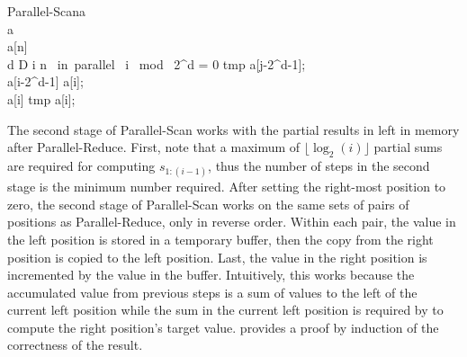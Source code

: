 {\begin{pseudocode}[ruled]{Parallel-Scan}{a}
\label{scan}
\\
a \GETS {}\\
a[n] \\
\FOR d \GETS D  \DO \BEGIN
  \FOR i  \TO n \mbox{ in parallel }\DO \BEGIN
    \IF i \mbox{ mod } 2^{d} = 0 \DO \BEGIN
    tmp \GETS a[j-2^{d-1}];\\
    a[i-2^{d-1}] \GETS a[i];\\
    a[i] \GETS tmp \oplus a[i];
    \END \END \END
{}
\end{pseudocode}



The second stage of Parallel-Scan works with the partial results in left in memory after Parallel-Reduce. First, note that a maximum of $\lfloor \log_2(i) \rfloor$ partial sums are required for computing $s_{1:(i-1)}$, thus the number of steps in the second stage is the minimum number required. After setting the right-most position to zero, the second stage of Parallel-Scan works on the same sets of pairs of positions as Parallel-Reduce, only in reverse order. Within each pair, the value in the left position is stored in a temporary buffer, then the copy from the right position is copied to the left position. Last, the value in the right position is incremented by the value in the buffer. Intuitively, this works because the accumulated value from previous steps is a sum of values to the left of the current left position while the sum in the current left position is required by to compute the right position's target value. \citet{blelloch1990} provides a proof by induction of the correctness of the result.



% 

}
